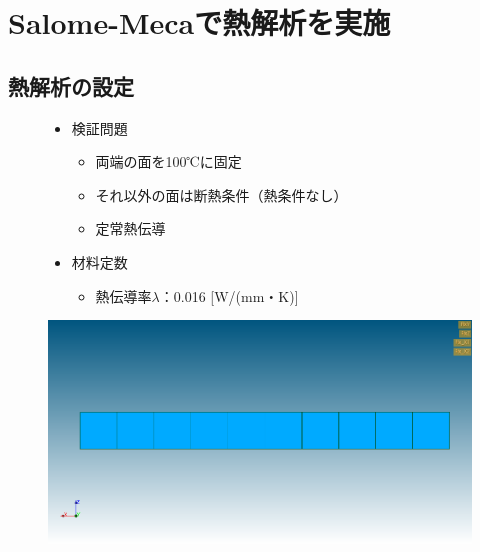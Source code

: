\section{Salome-Mecaで熱解析を実施}
\subsection{熱解析の設定}
\begin{figure}[H]
	\begin{minipage}{0.49\hsize}
		\begin{itemize}
			\item 検証問題
			      \begin{itemize}
				      \item 両端の面を100℃に固定
				      \item それ以外の面は断熱条件（熱条件なし）
				      \item 定常熱伝導
			      \end{itemize}
		\end{itemize}
	\end{minipage}
	\begin{minipage}{0.49\hsize}
		\begin{itemize}
			\item 材料定数
			      \begin{itemize}
				      \item 熱伝導率$\lambda$：0.016 [W/(mm・K)]
				            \vspace{2\baselineskip}
			      \end{itemize}
		\end{itemize}
	\end{minipage}
\end{figure}
\begin{figure}[H]
	\centering
	\includegraphics[width=0.6\columnwidth]{fig/setting.png}
\end{figure}
